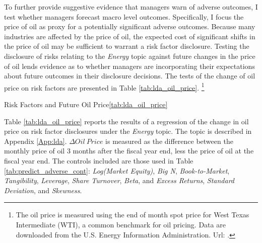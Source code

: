 To further provide suggestive evidence that managers warn of adverse outcomes, I test whether managers forecast macro level outcomes.
Specifically, I focus the price of oil as proxy for a potentially significant adverse outcomes.
Because many industries are affected by the price of oil, the expected cost of significant shifts in the price of oil may be sufficient to warrant a risk factor disclosure.
Testing the disclosure of risks relating to the \textit{Energy} topic against future changes in the price of oil lends evidence as to whether managers are incorporating their expectations about future outcomes in their disclosure decisions.
The tests of the change of oil price on risk factors are presented in Table \ref{tab:lda_oil_price}.%
	\footnote{The oil price is measured using the end of month spot price for West Texas Intermediate (WTI), a common benchmark for oil pricing. Data are downloaded from the U.S. Energy Information Administration. Url: .}



\begin{thesistable}{Risk Factors and Future Oil Price}{\ref{tab:lda_oil_price}}
    \label{tab:lda_oil_price}
    
    Table \ref{tab:lda_oil_price} reports the results of a regression of the change in oil price on risk factor disclosures under the \textit{Energy} topic.
    The topic is described in Appendix \ref{App:lda}.
    $ \Delta Oil\ Price $ is measured as the difference between the monthly price of oil 3 months after the fiscal year end, less the price of oil at the fiscal year end.
    The controls included are those used in Table \ref{tab:predict_adverse_cont}: \textit{Log(Market Equity)}, \textit{Big N}, \textit{Book-to-Market}, \textit{Tangibility}, \textit{Leverage}, \textit{Share Turnover}, \textit{Beta}, and \textit{Excess Returns}, \textit{Standard Deviation}, and \textit{Skewness}.
    \postamble
    
    \startdata
    
\end{thesistable}



